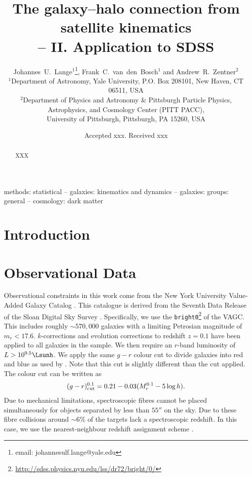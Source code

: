 \documentclass[fleqn,usenatbib,useAMS]{mnras}
\title[Satellite Kinematics -- Application to SDSS]
	{The galaxy--halo connection from satellite kinematics\\ -- II. Application to SDSS}
\author[J.~U.~Lange et al.]
{Johannes~U.~Lange$^1$\thanks{email: johannesulf.lange@yale.edu}, Frank~C.~van~den~Bosch$^1$ and Andrew~R.~Zentner$^2$\\
	$^1$Department of Astronomy, Yale University, P.O. Box 208101, New Haven, CT 06511, USA\\
	$^2$Department of Physics and Astronomy \& Pittsburgh Particle Physics, Astrophysics, and Cosmology Center (PITT PACC),\\University of Pittsburgh, Pittsburgh, PA 15260, USA}
\begin{document}
\date{Accepted xxx. Received xxx}

\label{firstpage}
\pagerange{\pageref{firstpage}--\pageref{lastpage}}

\maketitle

\begin{abstract}
	XXX
\end{abstract}

\begin{keywords}
methods: statistical -- galaxies: kinematics and dynamics -- galaxies: groups: 
general -- cosmology: dark matter
\end{keywords}

\section{Introduction}

\section{Observational Data}
\label{sec:data}

Observational constraints in this work come from the New York University Value-Added Galaxy Catalog \citep[VAGC;][]{Blanton+05}. This catalogue is derived from the Seventh Data Release of the Sloan Digital Sky Survey \citep[SDSS DR7;][]{Abazajian+09}. Specifically, we use the \texttt{bright0}\footnote{\url{http://sdss.physics.nyu.edu/lss/dr72/bright/0/}} of the VAGC. This includes roughly $\sim 570,000$ galaxies with a limiting Petrosian magnitude of $m_r < 17.6$. $k$-corrections and evolution corrections to redshift $z = 0.1$ have been applied to all galaxies in the sample. We then require an $r$-band luminosity of $L > 10^{9.5} \Lsunh$. We apply the same $g - r$ colour cut to divide galaxies into red and blue as used by \cite{Zehavi+11}. Note that this cut is slightly different than the cut \cite{More+11} applied. The colour cut can be written as
\begin{equation}
	(g - r)_{\rm cut}^{0.1} = 0.21 - 0.03 (M_r^{0.1} - 5 \log h).
\end{equation}
Due to mechanical limitations, spectroscopic fibres cannot be placed simultaneously for objects separated by less than $55''$ on the sky. Due to these fibre collisions around $\sim 6\%$ of the targets lack a spectroscopic redshift. In this case, we use the nearest-neighbour redshift assignment scheme \citep{Zehavi+05}. 
\end{document}
